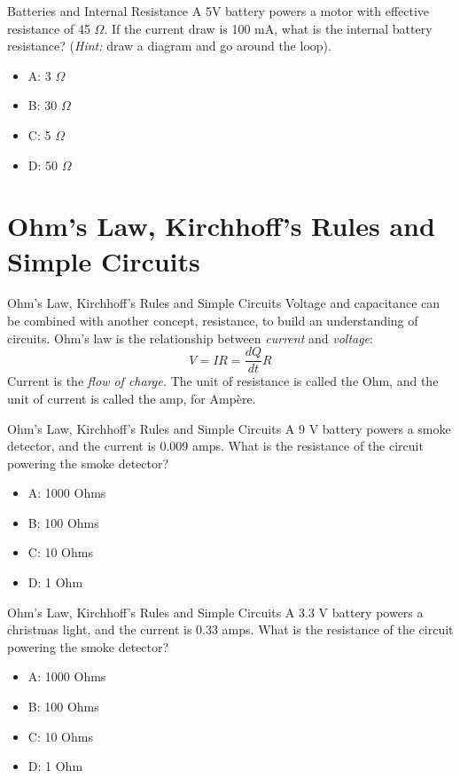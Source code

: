 \documentclass{beamer}
\begin{document}
\begin{frame}{Batteries and Internal Resistance}
A 5V battery powers a motor with effective resistance of 45 $\Omega$.  If the current draw is 100 mA, what is the internal battery resistance? (\textit{Hint:} draw a diagram and go around the loop).
\begin{itemize}
\item A: 3 $\Omega$
\item B: 30 $\Omega$
\item C: 5 $\Omega$
\item D: 50 $\Omega$
\end{itemize}
\end{frame}

\section{Ohm's Law, Kirchhoff's Rules and Simple Circuits}

\begin{frame}{Ohm's Law, Kirchhoff's Rules and Simple Circuits}
Voltage and capacitance can be combined with another concept, \alert{resistance}, to build an understanding of \alert{circuits}.  Ohm's law is the relationship between \textit{current} and \textit{voltage}:
\begin{equation}
V = I R = \frac{dQ}{dt}R
\end{equation}
Current is the \textit{flow of charge.}  The unit of resistance is called the Ohm, and the unit of current is called the amp, for Amp\`{e}re.
\end{frame}

\begin{frame}{Ohm's Law, Kirchhoff's Rules and Simple Circuits}
A 9 V battery powers a smoke detector, and the current is 0.009 amps.  What is the resistance of the circuit powering the smoke detector?
\begin{itemize}
\item A: 1000 Ohms
\item B: 100 Ohms
\item C: 10 Ohms
\item D: 1 Ohm
\end{itemize}
\end{frame}

\begin{frame}{Ohm's Law, Kirchhoff's Rules and Simple Circuits}
A 3.3 V battery powers a christmas light, and the current is 0.33 amps.  What is the resistance of the circuit powering the smoke detector?
\begin{itemize}
\item A: 1000 Ohms
\item B: 100 Ohms
\item C: 10 Ohms
\item D: 1 Ohm
\end{itemize}
\end{frame}
\end{document}

